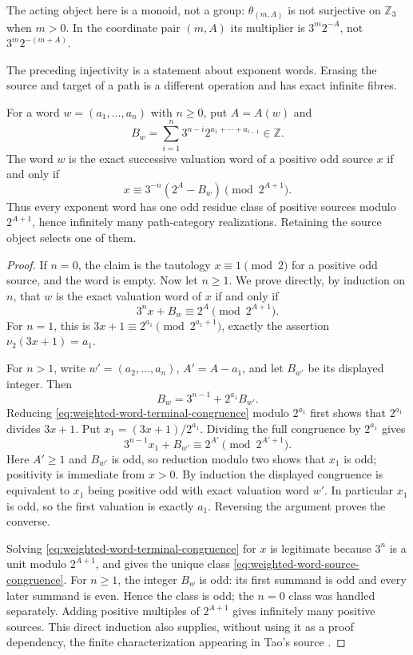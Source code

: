 The acting object here is a monoid, not a group: $\theta_{(m,A)}$ is not
surjective on $\mathbb Z_3$ when $m>0$.  In the coordinate pair $(m,A)$ its
multiplier is $3^m2^{-A}$, not $3^m2^{-(m+A)}$.

The preceding injectivity is a statement about exponent words.  Erasing the
source and target of a path is a different operation and has exact infinite
fibres.

\begin{proposition}
\label{prop:weighted-word-source-fibres}
For a word $w=(a_1,\ldots,a_n)$ with $n\geq0$, put $A=A(w)$ and
\[
 B_w=\sum_{i=1}^n3^{n-i}2^{a_1+\cdots+a_{i-1}}\in\mathbb Z.
\]
The word $w$ is the exact successive valuation word of a positive odd source
$x$ if and only if
\begin{equation}
\label{eq:weighted-word-source-congruence}
 x\equiv3^{-n}(2^A-B_w)\pmod{2^{A+1}}.
\end{equation}
Thus every exponent word has one odd residue class of positive sources modulo
$2^{A+1}$, hence infinitely many path-category realizations.  Retaining the
source object selects one of them.
\end{proposition}

\begin{proof}
If $n=0$, the claim is the tautology $x\equiv1\pmod2$ for a positive odd
source, and the word is empty.  Now let $n\geq1$.  We prove directly, by
induction on $n$, that $w$ is the exact valuation
word of $x$ if and only if
\begin{equation}
\label{eq:weighted-word-terminal-congruence}
 3^nx+B_w\equiv2^A\pmod{2^{A+1}}.
\end{equation}
For $n=1$, this is
$3x+1\equiv2^{a_1}\pmod{2^{a_1+1}}$, exactly the assertion
$\nu_2(3x+1)=a_1$.

For $n>1$, write $w'=(a_2,\ldots,a_n)$,
$A'=A-a_1$, and let $B_{w'}$ be its displayed integer.  Then
\[
 B_w=3^{n-1}+2^{a_1}B_{w'}.
\]
Reducing \eqref{eq:weighted-word-terminal-congruence} modulo $2^{a_1}$
first shows that $2^{a_1}$ divides $3x+1$.  Put
$x_1=(3x+1)/2^{a_1}$.  Dividing the full congruence by $2^{a_1}$ gives
\[
 3^{n-1}x_1+B_{w'}\equiv2^{A'}\pmod{2^{A'+1}}.
\]
Here $A'\geq1$ and $B_{w'}$ is odd, so reduction modulo two shows that
$x_1$ is odd; positivity is immediate from $x>0$.  By induction the displayed
congruence is equivalent to $x_1$ being positive odd with exact
valuation word $w'$.  In particular $x_1$ is odd, so the first valuation is
exactly $a_1$.  Reversing the argument proves the converse.

Solving \eqref{eq:weighted-word-terminal-congruence} for $x$ is legitimate
because $3^n$ is a unit modulo $2^{A+1}$, and gives the unique class
\eqref{eq:weighted-word-source-congruence}.  For $n\geq1$, the integer $B_w$
is odd: its first summand is odd and every later summand is even.  Hence the
class is odd; the $n=0$ class was handled separately.
Adding positive multiples of $2^{A+1}$ gives infinitely many positive
sources.  This direct induction also supplies, without using it as a proof
dependency, the finite characterization appearing in Tao's source
\cite[source lines 455--470]{Tao2026v7}.
\end{proof}

